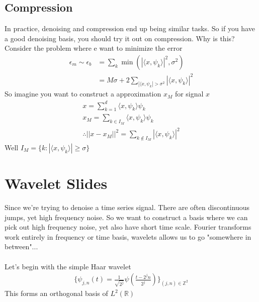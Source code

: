 \subsection{Compression}
In practice, denoising and compression end up being similar tasks. So if you have a good denoising basis, you should try it out on compression. Why is this? Consider the problem where e want to minimize the error
\begin{align}
	\epsilon _m \sim \epsilon_b & = \sum_k \min(|\langle x, \psi_k \rangle|^2 , \sigma^2)\\
	& = M \sigma + 2 \sum_{|\langle x, \psi_k | > \sigma^2} |\langle x, \psi_k \rangle |^2
\end{align}
So imagine you want to construct a approximation $x_M$ for signal $x$ 
\begin{align}
	x = \sum_{k=1}^d \langle x, \psi_k \rangle \psi_k\\
	x_M = \sum_{k \in I_M} \langle x, \psi_k \rangle \psi_k\\
	\therefore || x - x_M ||^2 = \sum_{k \notin I_M} |\langle x, \psi_k \rangle|^2
\end{align}
Well $I_M = \{ k: |\langle x, \psi_k \rangle | \geq \sigma \}$

\section{Wavelet Slides}
Since we're trying to denoise a time series signal. There are often discontinuous jumps, yet high frequency noise. So we want to construct a basis where we can pick out high frequency noise, yet also have short time scale. Fourier transforms work entirely in frequency or time basis, wavelets allows us to go "somewhere in between"...\\
\\
Let's begin with the simple Haar wavelet
\begin{align}
	\{ \psi_{j,n}(t) = \frac{1}{\sqrt{2^j}} \psi( \frac{t - 2^j n}{2^j})\}_{(j,n) \in \mathbb Z^2} 
\end{align}
This forms an orthogonal basis of $L^2(\mathbb R)$

